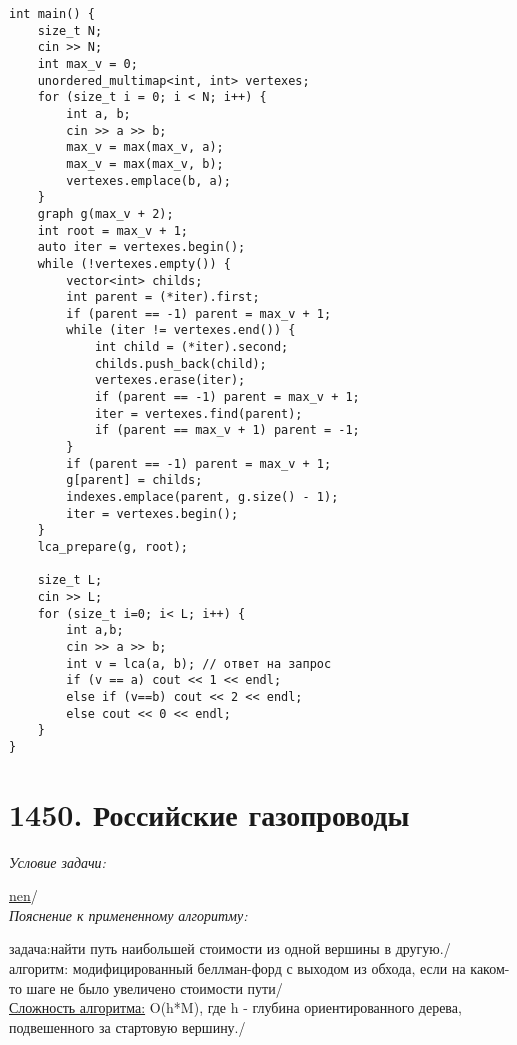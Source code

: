 \begin{center}
\begin{verbatim}
int main() {
    size_t N;
    cin >> N;
    int max_v = 0;
    unordered_multimap<int, int> vertexes;
    for (size_t i = 0; i < N; i++) {
        int a, b;
        cin >> a >> b;
        max_v = max(max_v, a);
        max_v = max(max_v, b);
        vertexes.emplace(b, a);
    }
    graph g(max_v + 2);
    int root = max_v + 1;
    auto iter = vertexes.begin();
    while (!vertexes.empty()) {
        vector<int> childs;
        int parent = (*iter).first;
        if (parent == -1) parent = max_v + 1;
        while (iter != vertexes.end()) {
            int child = (*iter).second;
            childs.push_back(child);
            vertexes.erase(iter);
            if (parent == -1) parent = max_v + 1;
            iter = vertexes.find(parent);
            if (parent == max_v + 1) parent = -1;
        }
        if (parent == -1) parent = max_v + 1;
        g[parent] = childs;
        indexes.emplace(parent, g.size() - 1);
        iter = vertexes.begin();
    }
    lca_prepare(g, root);

    size_t L;
    cin >> L;
    for (size_t i=0; i< L; i++) {
        int a,b;
        cin >> a >> b;
        int v = lca(a, b); // ответ на запрос
        if (v == a) cout << 1 << endl;
        else if (v==b) cout << 2 << endl;
        else cout << 0 << endl;
    }
}
    \end{verbatim}
\end{center}
\normalsize
\newpage


\section{1450. Российские газопроводы}
\textit{Условие задачи:} \par
\href{https://acm.timus.ru/problem.aspx?space=1&num=1329}{nen}/\\

\textit{Пояснение к примененному алгоритму:} \par
задача:найти путь наибольшей стоимости из одной вершины в другую./ алгоритм: модифицированный беллман-форд с выходом из обхода, если
на каком-то шаге не было увеличено стоимости пути/\\

\underline{Сложность алгоритма:} O(h*M), где h - глубина ориентированного дерева, подвешенного за стартовую вершину./\\

